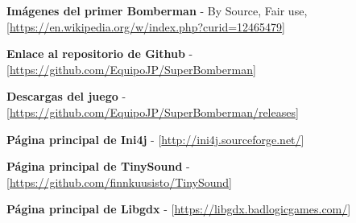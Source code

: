 \documentclass[a4paper]{article}
\begin{document}
\begin{thebibliography}{99}
	 \textbf{Imágenes del primer Bomberman} - By Source, Fair use, [\url{https://en.wikipedia.org/w/index.php?curid=12465479}]
	
	\bibitem{} \textbf{Enlace al repositorio de Github} - [\url{https://github.com/EquipoJP/SuperBomberman}]
	
	\bibitem{} \textbf{Descargas del juego} - [\url{https://github.com/EquipoJP/SuperBomberman/releases}]
	
	\bibitem{} \textbf{Página principal de Ini4j} - [\url{http://ini4j.sourceforge.net/}]
	
	\bibitem{} \textbf{Página principal de TinySound} - [\url{https://github.com/finnkuusisto/TinySound}]
	
	\bibitem{} \textbf{Página principal de Libgdx} - [\url{https://libgdx.badlogicgames.com/}]
	
\end{thebibliography}
\end{document}

